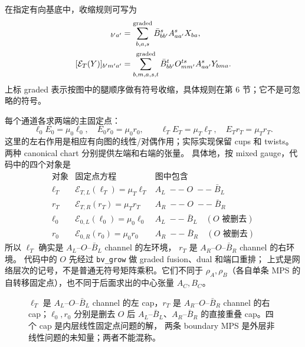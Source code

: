 \documentclass[11pt]{article}
\newcommand{\ET}{\mathcal E_T}
\newcommand{\EZ}{\mathcal E_0}
\begin{document}
在指定有向基底中，收缩规则可写为
\begin{align}
[\EZ(X)]_{b'a'}&=\sum_{b,a,s}^{\rm graded}\bar B^s_{bb'}A^s_{aa'}X_{ba},\\
[\ET(Y)]_{b'm'a'}&=\sum_{b,m,a,s,t}^{\rm graded}\bar B^t_{bb'}O^{ts}_{mm'}A^s_{aa'}Y_{bma}.
\end{align}
上标 graded 表示按图中的腿顺序做有符号收缩，具体规则在第 6 节；它不是可忽略的符号。

每个通道各求两端的主固定点：
\[
\ell_0E_0=\mu_0\ell_0,\quad E_0r_0=\mu_0r_0,
\qquad \ell_TE_T=\mu_T\ell_T,\quad E_Tr_T=\mu_Tr_T.
\]
这里的左右作用是相应有向图的线性/对偶作用；实际实现保留 cups 和 twists。
两种 canonical chart 分别提供左端和右端的张量。
具体地，按 mixed gauge，代码中的四个对象是
\[
\begin{array}{c|c|c}
\text{对象}&\text{固定点方程}&\text{图中包含}\\ \hline
\ell_T&\mathcal E_{T,L}(\ell_T)=\mu_T\ell_T
&A_L\;--\;O\;--\;\bar B_L\\
r_T&\mathcal E_{T,R}(r_T)=\mu_T r_T
&A_R\;--\;O\;--\;\bar B_R\\
\ell_0&\mathcal E_{0,L}(\ell_0)=\mu_0\ell_0
&A_L\;--\;\bar B_L\quad(O\text{ 被删去})\\
r_0&\mathcal E_{0,R}(r_0)=\mu_0 r_0
&A_R\;--\;\bar B_R\quad(O\text{ 被删去})
\end{array}
\]
所以 $\ell_T$ 确实是 $A_L$--$O$--$\bar B_L$ channel 的左环境，
$r_T$ 是 $A_R$--$O$--$\bar B_R$ channel 的右环境。
代码中的 $O$ 先经过 \texttt{bv\_grow} 做 graded fusion、dual 和端口重排；
上式是网络层次的记号，不是普通无符号矩阵乘积。它们不同于
$\rho_A,\rho_B$（各自单条 MPS 的自转移固定点），也不同于后面求出的中心张量 $A_C,B_C$。
\begin{figure}[h]\centering
{}
\caption{$\ell_T$ 是 $A_L$--$O$--$\bar B_L$ channel 的左 cap，$r_T$ 是
$A_R$--$O$--$\bar B_R$ channel 的右 cap；$\ell_0,r_0$ 分别是删去 $O$ 后
$A_L$--$\bar B_L$、$A_R$--$\bar B_R$ 的直接重叠 cap。四个 cap 是内层线性固定点问题的解，
两条 boundary MPS 是外层非线性问题的未知量；两者不能混称。}
\end{figure}
\end{document}
